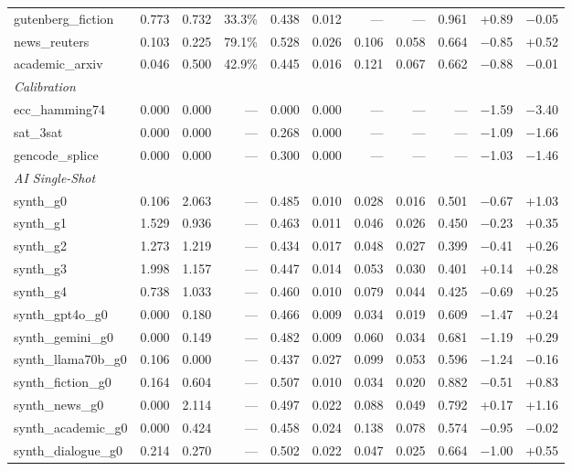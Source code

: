 \documentclass[11pt]{article}
\begin{document}
\begin{table}[h!]
\begin{tabular}{lrrrrrrrrrr}
gutenberg\_fiction & 0.773 & 0.732 & 33.3\% & 0.438 & 0.012 & --- & --- & 0.961 & +0.89 & $-$0.05 \\
news\_reuters & 0.103 & 0.225 & 79.1\% & 0.528 & 0.026 & 0.106 & 0.058 & 0.664 & $-$0.85 & +0.52 \\
academic\_arxiv & 0.046 & 0.500 & 42.9\% & 0.445 & 0.016 & 0.121 & 0.067 & 0.662 & $-$0.88 & $-$0.01 \\
\midrule
\multicolumn{11}{l}{\textit{Calibration}} \\
ecc\_hamming74 & 0.000 & 0.000 & --- & 0.000 & 0.000 & --- & --- & --- & $-$1.59 & $-$3.40 \\
sat\_3sat & 0.000 & 0.000 & --- & 0.268 & 0.000 & --- & --- & --- & $-$1.09 & $-$1.66 \\
gencode\_splice & 0.000 & 0.000 & --- & 0.300 & 0.000 & --- & --- & --- & $-$1.03 & $-$1.46 \\
\midrule
\multicolumn{11}{l}{\textit{AI Single-Shot}} \\
synth\_g0 & 0.106 & 2.063 & --- & 0.485 & 0.010 & 0.028 & 0.016 & 0.501 & $-$0.67 & +1.03 \\
synth\_g1 & 1.529 & 0.936 & --- & 0.463 & 0.011 & 0.046 & 0.026 & 0.450 & $-$0.23 & +0.35 \\
synth\_g2 & 1.273 & 1.219 & --- & 0.434 & 0.017 & 0.048 & 0.027 & 0.399 & $-$0.41 & +0.26 \\
synth\_g3 & 1.998 & 1.157 & --- & 0.447 & 0.014 & 0.053 & 0.030 & 0.401 & +0.14 & +0.28 \\
synth\_g4 & 0.738 & 1.033 & --- & 0.460 & 0.010 & 0.079 & 0.044 & 0.425 & $-$0.69 & +0.25 \\
synth\_gpt4o\_g0 & 0.000 & 0.180 & --- & 0.466 & 0.009 & 0.034 & 0.019 & 0.609 & $-$1.47 & +0.24 \\
synth\_gemini\_g0 & 0.000 & 0.149 & --- & 0.482 & 0.009 & 0.060 & 0.034 & 0.681 & $-$1.19 & +0.29 \\
synth\_llama70b\_g0 & 0.106 & 0.000 & --- & 0.437 & 0.027 & 0.099 & 0.053 & 0.596 & $-$1.24 & $-$0.16 \\
synth\_fiction\_g0 & 0.164 & 0.604 & --- & 0.507 & 0.010 & 0.034 & 0.020 & 0.882 & $-$0.51 & +0.83 \\
synth\_news\_g0 & 0.000 & 2.114 & --- & 0.497 & 0.022 & 0.088 & 0.049 & 0.792 & +0.17 & +1.16 \\
synth\_academic\_g0 & 0.000 & 0.424 & --- & 0.458 & 0.024 & 0.138 & 0.078 & 0.574 & $-$0.95 & $-$0.02 \\
synth\_dialogue\_g0 & 0.214 & 0.270 & --- & 0.502 & 0.022 & 0.047 & 0.025 & 0.664 & $-$1.00 & +0.55 \\

\end{tabular}
\end{table}
\end{document}
